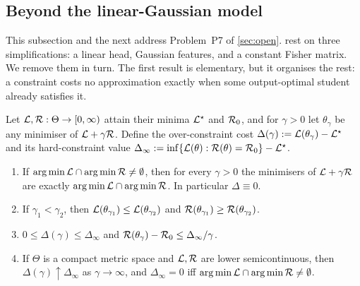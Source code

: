 \subsection{Beyond the linear-Gaussian model}\label{sec:repr-nonlinear}

This subsection and the next address Problem~P7 of \cref{sec:open}.  rest on
three simplifications: a linear head, Gaussian features, and a constant Fisher matrix. We remove them in turn. The
first result is elementary, but it organises the rest: a constraint costs no approximation exactly when some
output-optimal student already satisfies it.

\begin{lemma}\label{lem:penalty}
\Pv\Ck Let $\mathcal{L},\mathcal{R}:\Theta\to[0,\infty)$ attain their minima $\mathcal{L}^\star$ and $\mathcal{R}_0$, and for $\gamma>0$ let $\theta_\gamma$ be any
minimiser of $\mathcal{L}+\gamma\mathcal{R}$. Define the over-constraint cost $\Delta(\gamma):=\mathcal{L}(\theta_\gamma)-\mathcal{L}^\star$ and its
hard-constraint value $\Delta_\infty:=\inf\{\mathcal{L}(\theta):\mathcal{R}(\theta)=\mathcal{R}_0\}-\mathcal{L}^\star$.
\begin{enumerate}[label=(\roman*),nosep]
\item If $\operatorname*{arg\,min}\mathcal{L}\cap\operatorname*{arg\,min}\mathcal{R}\neq\emptyset$, then for every $\gamma>0$ the minimisers of $\mathcal{L}+\gamma\mathcal{R}$ are exactly
$\operatorname*{arg\,min}\mathcal{L}\cap\operatorname*{arg\,min}\mathcal{R}$. In particular $\Delta\equiv0$.
\item If $\gamma_1<\gamma_2$, then $\mathcal{L}(\theta_{\gamma_1})\le\mathcal{L}(\theta_{\gamma_2})$ and $\mathcal{R}(\theta_{\gamma_1})\ge\mathcal{R}(\theta_{\gamma_2})$.
\item $0\le\Delta(\gamma)\le\Delta_\infty$ and $\mathcal{R}(\theta_\gamma)-\mathcal{R}_0\le\Delta_\infty/\gamma$.
\item If $\Theta$ is a compact metric space and $\mathcal{L},\mathcal{R}$ are lower semicontinuous, then $\Delta(\gamma)\uparrow\Delta_\infty$ as
$\gamma\to\infty$, and $\Delta_\infty=0$ iff $\operatorname*{arg\,min}\mathcal{L}\cap\operatorname*{arg\,min}\mathcal{R}\neq\emptyset$.
\end{enumerate}
\end{lemma}
